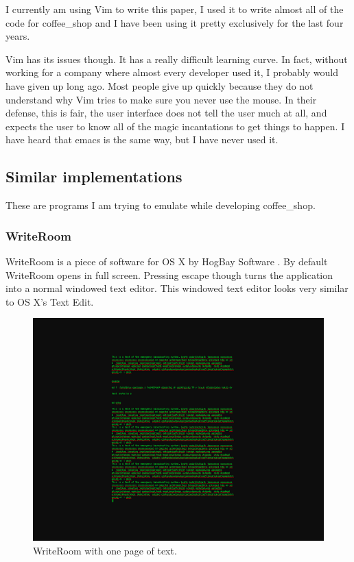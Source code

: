 \documentclass[10pt]{article}
\begin{document}
I currently am using Vim to write this paper, I used it to write almost all of the code for coffee\_shop and I have been using it pretty exclusively for the last four years.

Vim has its issues though. It has a really difficult learning curve. In fact, without working for a company where almost every developer used it, I probably would have given up long ago. Most people give up quickly because they do not understand why Vim tries to make sure you never use the mouse. In their defense, this is fair, the user interface does not tell the user much at all, and expects the user to know all of the magic incantations to get things to happen. I have heard that emacs is the same way, but I have never used it.

\subsection{Similar implementations}

These are programs I am trying to emulate while developing coffee\_shop.

\subsubsection{WriteRoom}

WriteRoom is a piece of software for OS X by HogBay Software \cite{writeroom}. By default WriteRoom opens in full screen. Pressing escape though turns the application into a normal windowed text editor. This windowed text editor looks very similar to OS X's Text Edit.

\begin{figure}
   \centering
      \includegraphics[width=130mm]{images/writeroom1.png}
   \caption{WriteRoom with one page of text.}
\end{figure}
\end{document}
